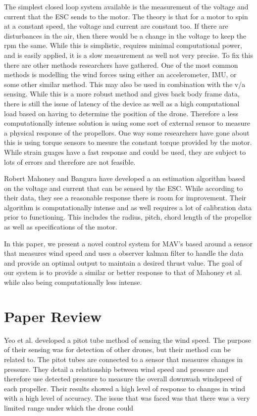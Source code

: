 \documentclass[twocolumn]{article}
\begin{document}
	The simplest closed loop system available is the measurement of the voltage and current that the ESC sends to the motor. The theory is that for a motor to spin at a constant speed, the voltage and current are constant too. If there are disturbances in the air, then there would be a change in the voltage to keep the rpm the same. While this is simplistic, requires minimal computational power, and is easily applied,  it is a slow measurement as well not very precise. To fix this there are other methods researchers have gathered. One of the most common methods is modelling the wind forces using either an accelerometer, IMU, or some other similar method. This may also be used in combination with the v/a sensing. While this is a more robust method and gives back body frame data, there is still the issue of latency of the device as well as a high computational load based on having to determine the position of the drone. Therefore a less computationally intense solution is using some sort of external sensor to measure a physical response of the propellors. One way some researchers have gone about this is using torque sensors to mesure the constant torque provided by the motor. While strain guages have a fast response and could be used, they are subject to lots of errors and therefore are not feasible. 
	
	Robert Mahoney and Bangura have developed a an estimation algorithm based on the voltage and current that can be sensed by the ESC. While according to their data, they see a reasonable response there is room for improvement. Their algorithm is computationally intense and as well requires a lot of calibration data prior to functioning. This includes the radius, pitch, chord length of the propellor as well as specifications of the motor. 
	
	In this paper, we present a novel control system for MAV's based around a sensor that measures wind speed and uses a observer kalman filter to handle the data and provide an optimal output to maintain a desired thrust value. The goal of our system is to provide a similar or better response to that of Mahoney et al. while also being computationally less intense. 
	\section{Paper Review}
	Yeo et al. developed a pitot tube method of sensing the wind speed. The purpose of their sensing was for detection of other drones, but their method can be related to. The pitot tubes are connected to a sensor that measures changes in pressure. They detail a relationship between wind speed and pressure and therefore use detected pressure to measure the overall downwash windspeed of each propeller. Their results showed a high level of response to changes in wind with a high level of accuracy. The issue that was faced was that there was a very limited range under which the drone could
\end{document}
